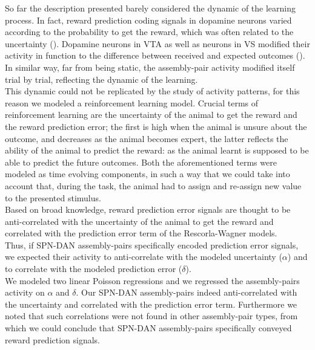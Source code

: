 So far the description presented barely considered the dynamic of the learning process. In fact, reward prediction coding signals in dopamine neurons varied according to the probability to get the reward, which was often related to the uncertainty (\cite{Schultz1992}). Dopamine neurons in VTA as well as neurons in VS modified their activity in function to the difference between received and expected outcomes (\cite{Fiorillo}). In similar way, far from being static, the assembly-pair activity modified itself trial by trial, reflecting the dynamic of the learning.\\This dynamic could not be replicated by the study of activity patterns, for this reason we modeled a reinforcement learning model. Crucial terms of reinforcement learning are the uncertainty of the animal to get the reward and the reward prediction error; the first is high when the animal is unsure about the outcome, and decreases as the animal becomes expert, the latter reflects the ability of the animal to predict the reward: as the animal learnt is supposed to be able to predict the future outcomes. Both the aforementioned terms were modeled as time evolving components, in such a way that we could take into account that, during the task, the animal had to assign and re-assign new value to the presented stimulus.\\Based on broad knowledge, reward prediction error signals are thought to be anti-correlated with the uncertainty of the animal to get the reward and correlated with the prediction error term of the Rescorla-Wagner models.\\Thus, if SPN-DAN assembly-pairs specifically encoded prediction error signals, we expected their activity to anti-correlate with the modeled uncertainty ($\alpha$) and to correlate with the modeled prediction error ($\delta$).\\We modeled two linear Poisson regressions and we regressed the assembly-pairs activity on $\alpha$ and $\delta$. Our SPN-DAN assembly-pairs indeed anti-correlated with the uncertainty and correlated with the prediction error term. Furthermore we noted that such correlations were not found in other assembly-pair types, from which we could conclude that SPN-DAN assembly-pairs specifically conveyed reward prediction signals.  